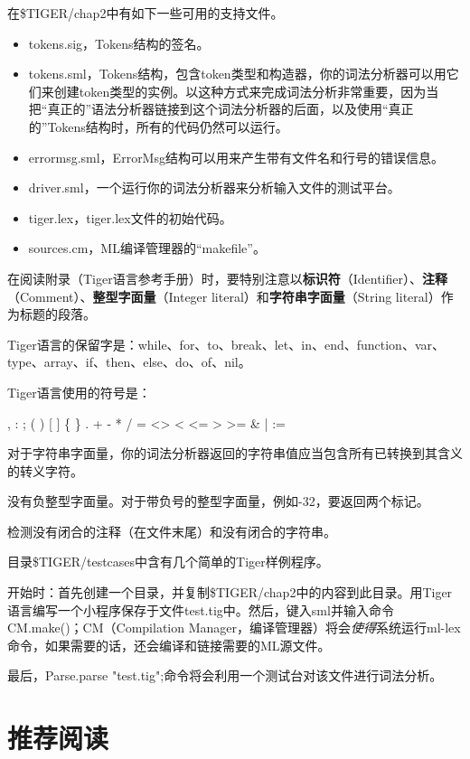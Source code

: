 \documentclass[cn,11pt,chinese]{elegantbook}
\begin{document}
在\$TIGER/chap2中有如下一些可用的支持文件。

\begin{itemize}
  \item tokens.sig，Tokens结构的签名。
  \item tokens.sml，Tokens结构，包含token类型和构造器，你的词法分析器可以用它们来创建token类型的实例。以这种方式来完成词法分析非常重要，因为当把“真正的”语法分析器链接到这个词法分析器的后面，以及使用“真正的”Tokens结构时，所有的代码仍然可以运行。
  \item errormsg.sml，ErrorMsg结构可以用来产生带有文件名和行号的错误信息。
  \item driver.sml，一个运行你的词法分析器来分析输入文件的测试平台。
  \item tiger.lex，tiger.lex文件的初始代码。
  \item sources.cm，ML编译管理器的“makefile”。
\end{itemize}

在阅读附录（Tiger语言参考手册）时，要特别注意以\textbf{标识符}（Identifier）、\textbf{注释}（Comment）、\textbf{整型字面量}（Integer literal）和\textbf{字符串字面量}（String literal）作为标题的段落。

Tiger语言的保留字是：while、for、to、break、let、in、end、function、var、type、array、if、then、else、do、of、nil。

Tiger语言使用的符号是：

, : ; ( ) [ ] \{ \} . + - * / = <> < <= > >= \& | :=

对于字符串字面量，你的词法分析器返回的字符串值应当包含所有已转换到其含义的转义字符。

没有负整型字面量。对于带负号的整型字面量，例如-32，要返回两个标记。

检测没有闭合的注释（在文件末尾）和没有闭合的字符串。

目录\$TIGER/testcases中含有几个简单的Tiger样例程序。

开始时：首先创建一个目录，并复制\$TIGER/chap2中的内容到此目录。用Tiger语言编写一个小程序保存于文件test.tig中。然后，键入sml并输入命令CM.make()；CM（Compilation Manager，编译管理器）将会\textit{使得}系统运行ml-lex命令，如果需要的话，还会编译和链接需要的ML源文件。

最后，Parse.parse "test.tig";命令将会利用一个测试台对该文件进行词法分析。

\section{推荐阅读}
\end{document}

